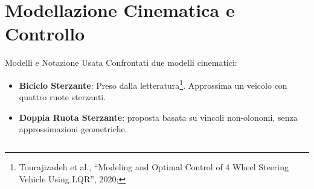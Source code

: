 \section{Modellazione Cinematica e Controllo}
\begin{frame}{Modelli e Notazione Usata}
    Confrontati due modelli cinematici:
    \begin{itemize}
        \item \textbf{Biciclo Sterzante}: Preso dalla letteratura\footnote{Tourajizadeh et al., ``Modeling and Optimal Control of 4 Wheel Steering Vehicle Using LQR'', 2020;}. Approssima un veicolo con quattro ruote sterzanti.
        \item \textbf{Doppia Ruota Sterzante}: proposta basata su vincoli non-olonomi, senza approssimazioni geometriche.
    \end{itemize}
    \begin{columns}


\end{columns}
\end{frame}
